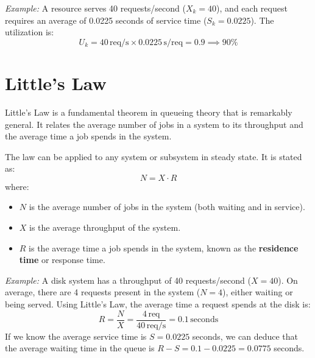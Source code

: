 \textit{Example:} A resource serves 40 requests/second ($X_k = 40$), and each request requires an average of 0.0225 seconds of service time ($S_k = 0.0225$). The utilization is:
\begin{equation*}
    U_k = 40 \, \text{req/s} \times 0.0225 \, \text{s/req} = 0.9 \implies 90\%
\end{equation*}

\section{Little's Law}
Little's Law is a fundamental theorem in queueing theory that is remarkably general. It relates the average number of jobs in a system to its throughput and the average time a job spends in the system.

The law can be applied to any system or subsystem in steady state. It is stated as:
\begin{equation}
    N = X \cdot R
\end{equation}
where:
\begin{itemize}
    \item $N$ is the average number of jobs in the system (both waiting and in service).
    \item $X$ is the average throughput of the system.
    \item $R$ is the average time a job spends in the system, known as the \textbf{residence time} or response time.
\end{itemize}


\textit{Example:} A disk system has a throughput of 40 requests/second ($X = 40$). On average, there are 4 requests present in the system ($N = 4$), either waiting or being served. Using Little's Law, the average time a request spends at the disk is:
\begin{equation*}
    R = \frac{N}{X} = \frac{4 \, \text{req}}{40 \, \text{req/s}} = 0.1 \, \text{seconds}
\end{equation*}
If we know the average service time is $S = 0.0225$ seconds, we can deduce that the average waiting time in the queue is $R - S = 0.1 - 0.0225 = 0.0775$ seconds.

